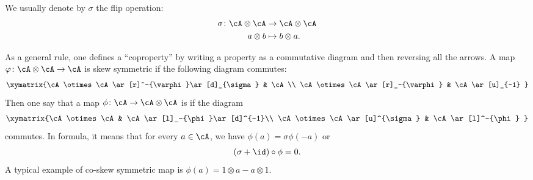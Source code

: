 We usually denote by \( \sigma\) the flip operation:
\begin{equation}
    \begin{aligned}
        \sigma\colon \cA\otimes\cA&\to \cA\otimes\cA \\
        a\otimes b&\mapsto b\otimes a. 
    \end{aligned}
\end{equation}

As a general rule, one defines a ``coproperty'' by writing a property as a commutative diagram and then reversing all the arrows. A map \( \varphi\colon \cA\otimes\cA\to \cA\) is skew symmetric if the following diagram commutes:
\begin{equation}
    \xymatrix{%
    \cA\otimes\cA \ar[r]^-{\varphi}\ar[d]_{\sigma}        &   \cA\\
       \cA\otimes\cA \ar[r]_-{\varphi}   &   \cA\ar[u]_{-1}
       }
\end{equation}
Then one say that a map \( \phi\colon \cA\to \cA\otimes\cA\) is  if the diagram
\begin{equation}
    \xymatrix{%
    \cA\otimes\cA       &   \cA\ar[l]_-{\phi}\ar[d]^{-1}\\
    \cA\otimes\cA\ar[u]^{\sigma}   &     \cA\ar[l]^-{\phi}
    }
\end{equation}
commutes. In formula, it means that for every \( a\in\cA\), we have \( \phi(a)=\sigma\phi(-a)\) or
\begin{equation}        \label{EqDefCoSkewSym}
    (\sigma+\id)\circ\phi=0.
\end{equation}
A typical example of co-skew symmetric map is \( \phi(a)=1\otimes a-a\otimes 1\).

